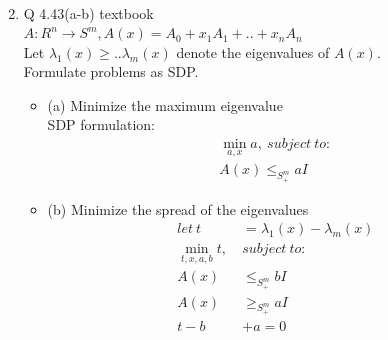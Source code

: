 \documentclass[12pt,letter]{article}
\begin{document}
\begin{enumerate}
\begin{align*}
  \end{align*}
\item Q 4.43(a-b) textbook\\
  $A:R^n \to S^m, A(x) = A_0 + x_1A_1 + .. + x_n A_n$\\
  Let $\lambda_1(x) \geq ..  \lambda_m(x)$ denote the eigenvalues of $A(x)$.\\
  Formulate problems as SDP.\\
  \begin{itemize}
  \item (a) Minimize the maximum eigenvalue\\
    SDP formulation:
    \begin{align*}
      \min_{a,x} a,\ subject\ to:\\
      A(x) \leq_{S_+^m} aI 
    \end{align*}
  \item (b) Minimize the spread of the eigenvalues
    \begin{align*}
      let\ t &= \lambda_1(x) - \lambda_m(x)\\
      \min_{t,x,a,b} t,\ & subject\ to:\\
      A(x) & \leq_{S_+^m} bI \\
      A(x) & \geq_{S_+^m} aI \\
      t - b & + a = 0
    \end{align*}
  \end{itemize}

  \pagebreak
  

\end{enumerate}
\end{document}
